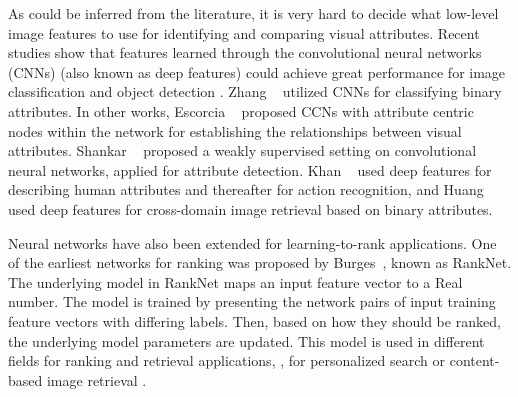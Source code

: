 As could be inferred from the literature, it is very hard to decide what low-level image features to use for identifying and comparing visual attributes. Recent studies show that features learned through the convolutional neural networks (CNNs) \cite{NIPS1989_293} (also known as deep features) could achieve great performance for image classification \cite{NIPS2012_4824} and object detection \cite{6909475}. Zhang \etal~\cite{6909608} utilized CNNs for classifying binary attributes. In other works, Escorcia \etal~\cite{Escorcia_2015_CVPR} proposed CCNs with attribute centric nodes within the network for establishing the relationships between visual attributes. Shankar \etal~\cite{Shankar_2015_CVPR} proposed a weakly supervised setting on convolutional neural networks, applied for attribute detection. Khan \etal~\cite{khan15} used deep features for describing human attributes and thereafter for action recognition, and Huang \etal~\cite{Huang_2015_ICCV} used deep features for cross-domain image retrieval based on binary attributes.

Neural networks have also been extended for learning-to-rank applications. One of the earliest networks for ranking was proposed by Burges\etal~\cite{Burges2005}, known as RankNet. The underlying model in RankNet maps an input feature vector to a Real number. The model is trained  by presenting the network pairs of input training feature vectors with differing labels. Then, based on how they should be ranked, the underlying model parameters are updated. This model is used in different fields for ranking and retrieval applications, \eg, for personalized search \cite{song2014} or content-based image retrieval \cite{Wan2014}. 

